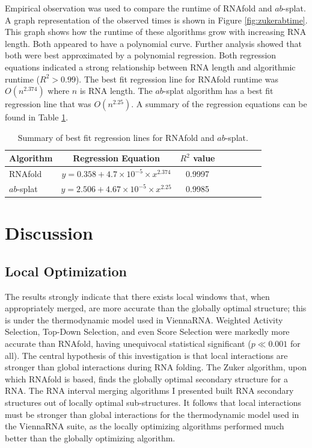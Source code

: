 \documentclass{cshonours}
\begin{document}
Empirical observation was used to compare the runtime of RNAfold and $ab$-splat. A graph representation of the observed times is shown in Figure \ref{fig:zukerabtime}. This graph shows how the runtime of these algorithms grow with increasing RNA length. Both appeared to have a polynomial curve. Further analysis showed that both were best approximated by a polynomial regression. Both regression equations indicated a strong relationship between RNA length and algorithmic runtime ($R^2 > 0.99$). The best fit regression line for RNAfold runtime was $O(n^{2.374})$ where $n$ is RNA length. The $ab$-splat algorithm has a best fit regression line that was $O(n^{2.25})$. A summary of the regression equations can be found in Table \ref{tab:algorithmtimeregression}.


\begin{table}
\centering
\begin{tabular}{l*{6}{c}r}
Algorithm	& Regression Equation & $R^2$ value \\
\hline
RNAfold &  $y=0.358+4.7 \times 10^{-5} \times x^{2.374}$    &    0.9997    \\
$ab$-splat & $y=2.506+ 4.67\times 10 ^{-5} \times x^{2.25}$    &    0.9985  \\
\end{tabular}

\caption{Summary of best fit regression lines for RNAfold and $ab$-splat.}
\label{tab:algorithmtimeregression}
\end{table}

\chapter{Discussion}

\section{Local Optimization}
\label{sec:localopt}
The results strongly indicate that there exists local windows that, when appropriately merged, are more accurate than the globally optimal structure; this is under the thermodynamic model used in ViennaRNA. Weighted Activity Selection, Top-Down Selection, and even Score Selection were markedly more accurate than RNAfold, having unequivocal statistical significant ($p \ll 0.001$ for all). The central hypothesis of this investigation is that local interactions are stronger than global interactions during RNA folding. The Zuker algorithm, upon which RNAfold is based, finds the globally optimal secondary structure for a RNA. The RNA interval merging algorithms I presented built RNA secondary structures out of locally optimal sub-structures. It follows that local interactions must be stronger than global interactions for the thermodynamic model used in the ViennaRNA suite, as the locally optimizing algorithms performed much better than the globally optimizing algorithm.
\end{document}
